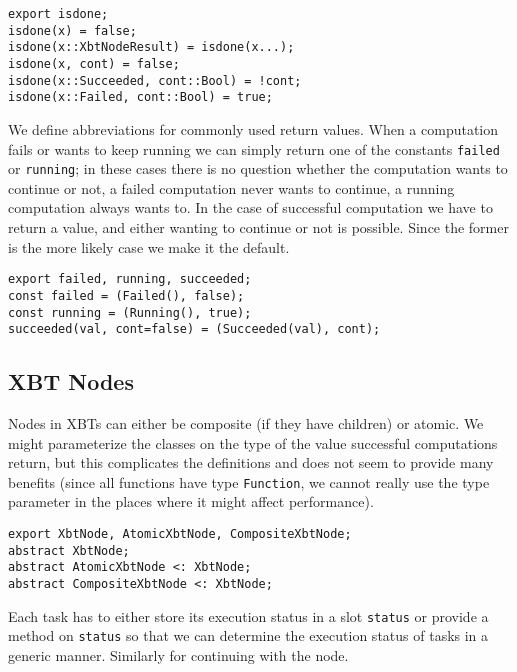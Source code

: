 \documentclass[a4wide]{article}
\begin{document}
\begin{verbatim}
export isdone;
isdone(x) = false;
isdone(x::XbtNodeResult) = isdone(x...);
isdone(x, cont) = false;
isdone(x::Succeeded, cont::Bool) = !cont;
isdone(x::Failed, cont::Bool) = true;
\end{verbatim}

We define abbreviations for commonly used return values. When a
computation fails or wants to keep running we can simply return one
of the constants \verb~failed~ or \verb~running~; in these cases there is no
question whether the computation wants to continue or not, a failed
computation never wants to continue, a running computation always
wants to.  In the case of successful computation we have to return
a value, and either wanting to continue or not is possible.  Since
the former is the more likely case we make it the default.
\begin{verbatim}
export failed, running, succeeded;
const failed = (Failed(), false);
const running = (Running(), true);
succeeded(val, cont=false) = (Succeeded(val), cont);
\end{verbatim}

\subsection{XBT Nodes}
\label{sec-3-3}

Nodes in XBTs can either be composite (if they have children) or
atomic.  We might parameterize the classes on the type of the value
successful computations return, but this complicates the
definitions and does not seem to provide many benefits (since all
functions have type \verb~Function~, we cannot really use the type
parameter in the places where it might affect performance).

\begin{verbatim}
export XbtNode, AtomicXbtNode, CompositeXbtNode;
abstract XbtNode;
abstract AtomicXbtNode <: XbtNode;
abstract CompositeXbtNode <: XbtNode;
\end{verbatim}

Each task has to either store its execution status in a slot
\verb~status~ or provide a method on \verb~status~ so that we can determine
the execution status of tasks in a generic manner.  Similarly for
continuing with the node.
\end{document}
